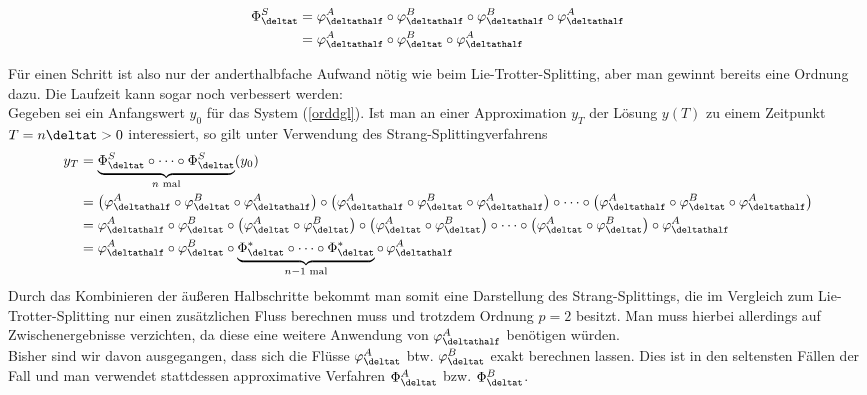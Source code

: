 \noindent\begin{minipage}{0.3\textwidth}

\end{minipage}%
\hfill%
\begin{minipage}{0.7\textwidth}
\begin{align}
\Phi_{\deltat}^S&=\varphi_{\deltathalf}^A\circ\varphi_{\deltathalf}^B\circ\varphi_{\deltathalf}^B\circ\varphi_{\deltathalf}^A\nonumber\\
&=\varphi_{\deltathalf}^A\circ\varphi_{\deltat}^B\circ\varphi_{\deltathalf}^A
\end{align}
\end{minipage}
Für einen Schritt ist also nur der anderthalbfache Aufwand nötig wie beim Lie-Trotter-Splitting, aber man gewinnt bereits eine Ordnung dazu. Die Laufzeit kann sogar noch verbessert werden:\\
Gegeben sei ein Anfangswert $y_0$ für das System (\ref{orddgl}). Ist man an einer Approximation $y_T$ der Lösung $y(T)$ zu einem Zeitpunkt $T=n\deltat>0$ interessiert, so gilt unter Verwendung des Strang-Splittingverfahrens
\begin{align*}
y_T&=\underbrace{\Phi_{\deltat}^S\circ\dots\circ\Phi_{\deltat}^S}_{n\text{ mal}}(y_0)\\
&=\left(\varphi_{\deltathalf}^A\circ\varphi_{\deltat}^B\circ\varphi_{\deltathalf}^A\right)\circ\left(
\varphi_{\deltathalf}^A\circ\varphi_{\deltat}^B\circ\varphi_{\deltathalf}^A\right)\circ\dots\circ\left(
\varphi_{\deltathalf}^A\circ\varphi_{\deltat}^B\circ\varphi_{\deltathalf}^A\right)\\
&=\varphi_{\deltathalf}^A\circ\varphi_{\deltat}^B\circ\left(\varphi_{\deltat}^A\circ\varphi_{\deltat}^B\right)\circ\left(\varphi_{\deltat}^A\circ\varphi_{\deltat}^B\right)\circ\dots\circ\left(\varphi_{\deltat}^A\circ\varphi_{\deltat}^B\right)\circ\varphi_{\deltathalf}^A\\
&=\varphi_{\deltathalf}^A\circ\varphi_{\deltat}^B\circ
\underbrace{\Phi_{\deltat}^*\circ\dots\circ\Phi_{\deltat}^*}_{n-1\text{ mal}}\circ\,\varphi_{\deltathalf}^A
\end{align*}
Durch das Kombinieren der äußeren Halbschritte bekommt man somit eine Darstellung des Strang-Splittings, die im Vergleich zum Lie-Trotter-Splitting nur einen zusätzlichen Fluss berechnen muss und trotzdem Ordnung $p=2$ besitzt. Man muss hierbei allerdings auf Zwischenergebnisse verzichten, da diese eine weitere Anwendung von $\varphi_{\deltathalf}^A$ benötigen würden.\\[0.5cm]
Bisher sind wir davon ausgegangen, dass sich die Flüsse $\varphi_{\deltat}^A$ btw. $\varphi_{\deltat}^B$ exakt berechnen lassen. Dies ist in den seltensten Fällen der Fall und man verwendet stattdessen approximative Verfahren $\Phi_{\deltat}^A$ bzw. $\Phi_{\deltat}^B$. 
